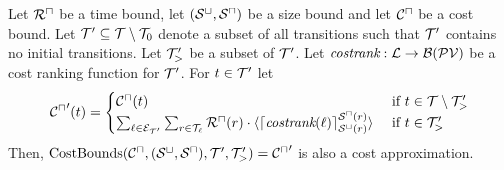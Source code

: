 \begin{theorem}[CostBounds]
  Let ${\mathcal{R}^\sqcap}$ be a time bound, let ${({\mathcal{S}^\sqcup}, {\mathcal{S}^\sqcap})}$ be a size bound and let ${\mathcal{C}^\sqcap}$ be a cost bound.
  Let $\mathcal{T}' \subseteq \mathcal{T} \setminus \mathcal{T}_0$ denote a subset of all transitions such that $\mathcal{T}'$ contains no initial transitions.
  Let $\mathcal{T}'_>$ be a subset of $\mathcal{T}'$.
  Let $\emph{costrank}: \mathcal{L} \rightarrow \mathcal{B}(\mathcal{PV})$ be a cost ranking function for $\mathcal{T}'$.
  For $t \in \mathcal{T}'$ let
  \[ {\mathcal{C}^\sqcap}'(t) = 
  \begin{cases}
    {\mathcal{C}^\sqcap}(t) & \text{ if } t \in \mathcal{T} \setminus \mathcal{T}'_> \\
    \sum_{\ell \in \mathcal{E}_{\mathcal{T}'}} \sum_{r \in \mathcal{T}_\ell} {\mathcal{R}^\sqcap}(r) \cdot \langle\lceil \emph{costrank}(\ell) \rceil^{{\mathcal{S}^\sqcap}(r)}_{{\mathcal{S}^\sqcup}(r)}\rangle & \text{ if } t \in \mathcal{T}'_>
  \end{cases}
  \]
  Then, $\text{CostBounds}({\mathcal{C}^\sqcap}, {({\mathcal{S}^\sqcup}, {\mathcal{S}^\sqcap})}, \mathcal{T}', \mathcal{T}'_>) = {\mathcal{C}^\sqcap}'$ is also a cost approximation.
\end{theorem}
